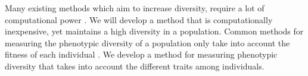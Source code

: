 Many existing methods which aim to increase diversity, require a lot of computational power \citpls{}. We will develop a method that is computationally inexpensive, yet maintains a high diversity in a population. Common methods for measuring the phenotypic diversity of a population only take into account the fitness of each individual \citpls{}. We develop a method for measuring phenotypic diversity that takes into account the different traits among individuals. 
